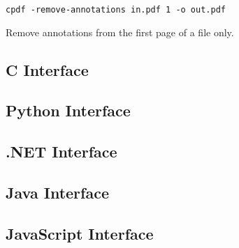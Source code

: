 \documentclass{book}
\begin{document}
  \begin{framed}
    \noindent\small\verb!cpdf -remove-annotations in.pdf 1 -o out.pdf!
    
    \vspace{2.5mm}
    \noindent Remove annotations from the first page of a file only.
  \end{framed}

\begin{cpdflib}
\clearpage
\section*{C Interface}
\begin{small}\tt

\end{small}
\end{cpdflib}

\begin{pycpdflib}
\clearpage
\section*{Python Interface}
\begin{small}\tt

\end{small}
\end{pycpdflib}

\begin{dotnetcpdflib}
\clearpage
\section*{.NET Interface}
\begin{small}\tt

\end{small}
\end{dotnetcpdflib}

\begin{jcpdflib}
\clearpage
\section*{Java Interface}
\begin{small}\tt

\end{small}
\end{jcpdflib}

\begin{jscpdflib}
\clearpage
\section*{JavaScript Interface}
\begin{small}\tt

\end{small}
\end{jscpdflib}
\end{document}
